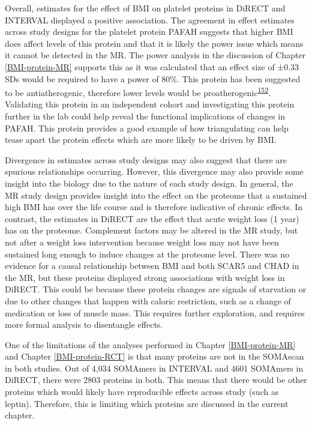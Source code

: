 \documentclass[11pt,twoside]{bristolthesis}
\begin{document}
Overall, estimates for the effect of BMI on platelet proteins in DiRECT and INTERVAL displayed a positive association. The agreement in effect estimates across study designs for the platelet protein PAFAH suggests that higher BMI does affect levels of this protein and that it is likely the power issue which means it cannot be detected in the MR. The power analysis in the discussion of Chapter \ref{BMI-protein-MR} supports this as it was calculated that an effect size of ±0.33 SDs would be required to have a power of 80\%. This protein has been suggested to be antiatherogenic, therefore lower levels would be proatherogenic\textsuperscript{\protect\hyperlink{ref-Noto2003}{152}}. Validating this protein in an independent cohort and investigating this protein further in the lab could help reveal the functional implications of changes in PAFAH. This protein provides a good example of how triangulating can help tease apart the protein effects which are more likely to be driven by BMI.

Divergence in estimates across study designs may also suggest that there are spurious relationships occurring. However, this divergence may also provide some insight into the biology due to the nature of each study design. In general, the MR study design provides insight into the effect on the proteome that a sustained high BMI has over the life course and is therefore indicative of chronic effects. In contrast, the estimates in DiRECT are the effect that acute weight loss (1 year) has on the proteome. Complement factors may be altered in the MR study, but not after a weight loss intervention because weight loss may not have been sustained long enough to induce changes at the proteome level. There was no evidence for a causal relationship between BMI and both SCAR5 and CHAD in the MR, but these proteins displayed strong associations with weight loss in DiRECT. This could be because these protein changes are signals of starvation or due to other changes that happen with caloric restriction, such as a change of medication or loss of muscle mass. This requires further exploration, and requires more formal analysis to disentangle effects.

One of the limitations of the analyses performed in Chapter \ref{BMI-protein-MR} and Chapter \ref{BMI-protein-RCT} is that many proteins are not in the SOMAscan in both studies. Out of 4,034 SOMAmers in INTERVAL and 4601 SOMAmers in DiRECT, there were 2803 proteins in both. This means that there would be other proteins which would likely have reproducible effects across study (such as leptin). Therefore, this is limiting which proteins are discussed in the current chapter.
\end{document}
